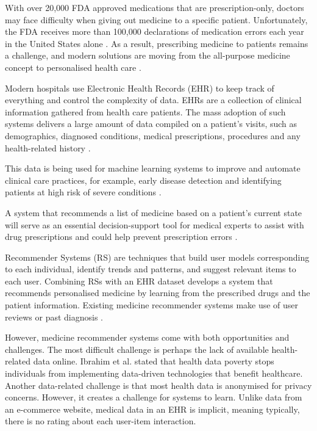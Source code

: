 With over 20,000 FDA approved medications that are prescription-only,
doctors may face difficulty when giving out medicine to a specific
patient. Unfortunately, the FDA receives more than 100,000 declarations
of medication errors each year in the United States alone \cite{FDA2021}.
As a result, prescribing medicine to patients remains a challenge, and
modern solutions are moving from the all-purpose medicine concept to
personalised health care \cite{Bhoi2021}.

Modern hospitals use Electronic Health Records (EHR) to keep track of
everything and control the complexity of data. EHRs are a collection of
clinical information gathered from health care patients. The mass
adoption of such systems delivers a large amount of data compiled on a
patient's visits, such as demographics, diagnosed conditions, medical
prescriptions, procedures and any health-related history \cite{Kim2019}.

This data is being used for machine learning systems to improve and
automate clinical care practices, for example, early disease detection
and identifying patients at high risk of severe conditions
\cite{10.2307/20720782, Juhn2019}.

A system that recommends a list of medicine based on a patient's current
state will serve as an essential decision-support tool for medical
experts to assist with drug prescriptions and could help prevent
prescription errors \cite{Jamshidi2018}. 

Recommender Systems (RS) are techniques that build user
models corresponding to each individual, identify trends
and patterns, and suggest relevant items to each user. Combining RSs with an EHR dataset develops 
a system that recommends personalised medicine by learning from
the prescribed drugs and the patient information. Existing medicine
recommender systems make use of user reviews or past
diagnosis \cite{Bhoi2021, Rao2020}.

However, medicine recommender systems come with both opportunities and
challenges. The most difficult challenge is perhaps the lack of available
health-related data online. Ibrahim et al. \cite{Ferner2000} stated that
health data poverty stops individuals from implementing data-driven
technologies that benefit healthcare. Another data-related challenge is
that most health data is anonymised for privacy concerns.
However, it creates a challenge for systems to learn. Unlike data
from an e-commerce website, medical data in an EHR is implicit, meaning
typically, there is no rating about each user-item interaction.


